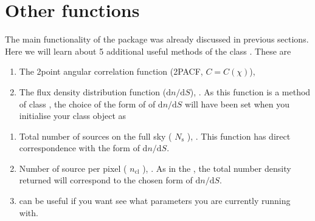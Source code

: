 \documentclass[letterpaper,10pt,english]{sphinxmanual}
\begin{document}
\sphinxstepscope


\chapter{Other functions}
\label{\detokenize{otherfuncs:other-functions}}\label{\detokenize{otherfuncs::doc}}
\sphinxAtStartPar
The main functionality of the package was already discussed in previous sections. Here we will learn about 5 additional useful methods of the class {\hyperref[\detokenize{api:furs.furs}]{}}. These are
\begin{enumerate}
%
\item {} 
\sphinxAtStartPar
The 2\sphinxhyphen{}point angular correlation function (2PACF, \(C=C(\chi)\)), 

\item {} 
\sphinxAtStartPar
The flux density distribution function (\(\mathrm{d}n/\mathrm{d}S\)), . As this function is a method of class {\hyperref[\detokenize{api:furs.furs}]{}}, the choice of the form of of \(\mathrm{d}n/\mathrm{d}S\) will have been set when you initialise your class {\hyperref[\detokenize{api:furs.furs}]{}} object as

\end{enumerate}

\begin{sphinxVerbatim}[commandchars=\\\{\}]
   

  
\end{sphinxVerbatim}
\begin{enumerate}
%
\setcounter{enumi}{2}
\item {} 
\sphinxAtStartPar
Total number of sources on the full sky ( \(N_{\mathrm{s}}\) ), . This  function has direct correspondence with the form of \(\mathrm{d}n/\mathrm{d}S\).

\item {} 
\sphinxAtStartPar
Number of source per pixel ( \(n_{\mathrm{cl}}\) ), . As in the , the total number density returned will correspond to the chosen form of \(\mathrm{d}n/\mathrm{d}S\).

\item {} 
\sphinxAtStartPar
{} can be useful if you want see what parameters you are currently running with.

\end{enumerate}
\end{document}
